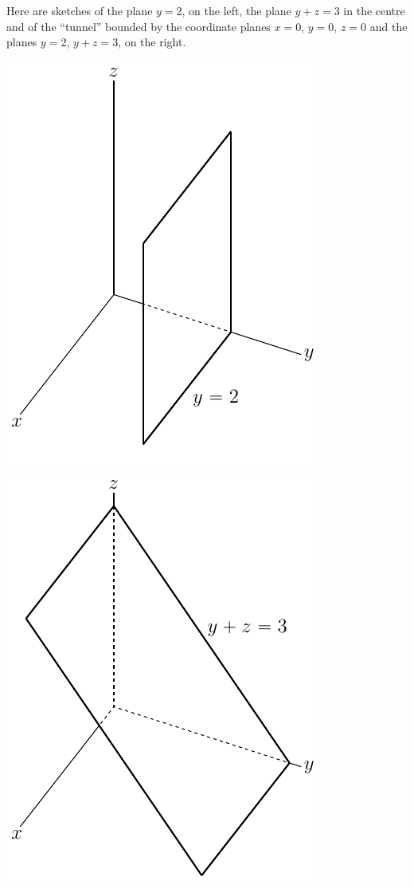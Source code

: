\begin{solution}
Here are sketches of the plane $y=2$, on the left, 
the plane $y+z=3$ in the centre and of the ``tunnel''
bounded by the coordinate planes $x=0$, $y=0$, $z=0$ and the
planes $y=2$, $y+z=3$, on the right.
\begin{center}
     \includegraphics[scale=0.7]{fig/OE16D_8a.pdf}\quad 
     \includegraphics[scale=0.7]{fig/OE16D_8b.pdf}\quad 

\end{center}
\end{solution}
